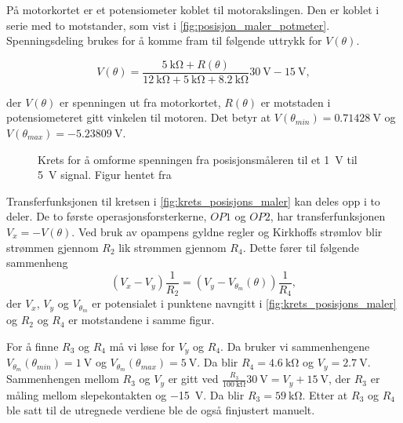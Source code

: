 På motorkortet er et potensiometer koblet til motorakslingen. Den er koblet i serie med to motstander, som vist i \autoref{fig:posisjon_maler_potmeter}. Spenningsdeling brukes for å komme fram til følgende uttrykk for $V(\theta)$.

\begin{equation}
    \label{eq:V_av_theta}
    V(\theta) = \frac{\SI{5}{\kilo\ohm} + R(\theta)}{\SI{12}{\kilo\ohm} + \SI{5}{\kilo\ohm} + \SI{8.2}{\kilo\ohm}} \SI{30}{\volt} - \SI{15}{\volt},
\end{equation}

der $V(\theta)$ er spenningen ut fra motorkortet, $R(\theta)$ er motstaden i potensiometeret gitt vinkelen til motoren. Det betyr at $V(\theta_{min}) = \SI{0.71428}{\volt}$ og $V(\theta_{max}) =\SI{-5.23809}{\volt}$. 

\begin{figure}[h]
    \centering
    
    \caption{Krets for å omforme spenningen fra posisjonsmåleren til et \SI{1}{\volt} til \SI{5}{\volt} signal. Figur hentet fra \cite{AnalogMotorlabbOppgaver}}
    \label{fig:krets_posisjons_maler}
\end{figure}

Transferfunksjonen til kretsen i \autoref{fig:krets_posisjons_maler} kan deles opp i to deler. De to første operasjonsforsterkerne, $OP1$ og $OP2$, har transferfunksjonen $V_x = -V(\theta)$. Ved bruk av opampens gyldne regler og Kirkhoffs strømlov blir strømmen gjennom $R_2$ lik strømmen gjennom $R_4$. Dette fører til følgende sammenheng
\begin{equation}
    \label{eq:posisjonmåler_skalering}
    (V_x - V_y) \frac{1}{R_2} = (V_y - V_{\theta_m}(\theta)) \frac{1}{R_4},
\end{equation}
der $V_x$, $V_y$ og $V_{\theta_m}$ er potensialet i punktene navngitt i \autoref{fig:krets_posisjons_maler} og $R_2$ og $R_4$ er motstandene i samme figur.


For å finne $R_3$ og $R_4$ må vi løse for $V_y$ og $R_4$. Da bruker vi sammenhengene $V_{\theta_m}(\theta_{min}) = \SI{1}{\volt}$ og $V_{\theta_m}(\theta_{max}) = \SI{5}{\volt}$. Da blir $R_4 = \SI{4.6}{\kilo\ohm}$ og 
$V_y = \SI{2.7}{\volt}$. Sammenhengen mellom $R_3$ og $V_y$ er gitt ved $\frac{R_3}{\SI{100}{\kilo\ohm}} \SI{30}{\volt} = V_y + \SI{15}{\volt}$, der $R_3$ er måling mellom slepekontakten og \SI{-15}{\volt}. Da blir $R_3 = \SI{59}{\kilo\ohm}$. Etter at $R_3$ og $R_4$ ble satt til de utregnede verdiene ble de også finjustert manuelt.

